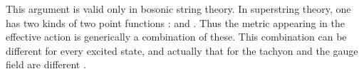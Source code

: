 \documentclass[a4paper,12pt]{article}
\begin{document}
This argument is valid only in bosonic string theory. In 
superstring theory, one has  two kinds of two point functions :  
\coordHE{} and 
\myHighlight{$\langle\psi^{\mu} \psi^{\nu} \rangle$}\coordHE{}. Thus the metric appearing in the
effective action is generically a combination of these. This combination
can be different for every excited state, and actually 
that for the tachyon and the gauge field are different 
\cite{Andreev}. 




\providecommand{\J}[4]{{\sl #1} {\bf #2} (#3) #4}
\providecommand{\andJ}[3]{{\bf #1} (#2) #3}
\providecommand{\AP}{Ann.\ Phys.\ (N.Y.)}
\providecommand{\MPL}{Mod.\ Phys.\ Lett.}
\providecommand{\NP}{Nucl.\ Phys.}
\providecommand{\PL}{Phys.\ Lett.}
\providecommand{\PR}{ Phys.\ Rev.}
\providecommand{\PRL}{Phys.\ Rev.\ Lett.}
\providecommand{\PTP}{Prog.\ Theor.\ Phys.}
\providecommand{\hep}[1]{{\tt hep-th/{#1}}}
\end{document}
